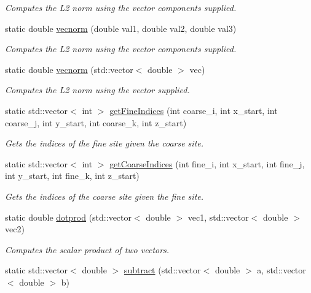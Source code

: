 \begin{DoxyCompactItemize}
\begin{DoxyCompactList}\small\item\em Computes the L2 norm using the vector components supplied. \end{DoxyCompactList}\item 
static double \hyperlink{class_grid_utils_a6caced99b15b01746c1fb5828c447034}{vecnorm} (double val1, double val2, double val3)
\begin{DoxyCompactList}\small\item\em Computes the L2 norm using the vector components supplied. \end{DoxyCompactList}\item 
static double \hyperlink{class_grid_utils_a45167f9bde2e34d868a4ccc64f588ab2}{vecnorm} (std\+::vector$<$ double $>$ vec)
\begin{DoxyCompactList}\small\item\em Computes the L2 norm using the vector supplied. \end{DoxyCompactList}\item 
static std\+::vector$<$ int $>$ \hyperlink{class_grid_utils_aee47fe58eccee5fffd67bb489fd1c315}{get\+Fine\+Indices} (int coarse\+\_\+i, int x\+\_\+start, int coarse\+\_\+j, int y\+\_\+start, int coarse\+\_\+k, int z\+\_\+start)
\begin{DoxyCompactList}\small\item\em Gets the indices of the fine site given the coarse site. \end{DoxyCompactList}\item 
static std\+::vector$<$ int $>$ \hyperlink{class_grid_utils_a4d3973d2b60fe6cac6e49e8640307958}{get\+Coarse\+Indices} (int fine\+\_\+i, int x\+\_\+start, int fine\+\_\+j, int y\+\_\+start, int fine\+\_\+k, int z\+\_\+start)
\begin{DoxyCompactList}\small\item\em Gets the indices of the coarse site given the fine site. \end{DoxyCompactList}\item 
static double \hyperlink{class_grid_utils_af374256beaf42d97b23f7d98af93a3f1}{dotprod} (std\+::vector$<$ double $>$ vec1, std\+::vector$<$ double $>$ vec2)
\begin{DoxyCompactList}\small\item\em Computes the scalar product of two vectors. \end{DoxyCompactList}\item 
static std\+::vector$<$ double $>$ \hyperlink{class_grid_utils_a6f5af65d6bb25e0d34be50670b41514f}{subtract} (std\+::vector$<$ double $>$ a, std\+::vector$<$ double $>$ b)

\end{DoxyCompactItemize}
